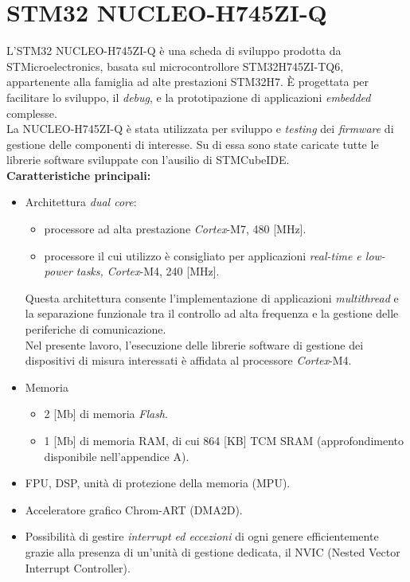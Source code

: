 \documentclass[11pt]{report}
\begin{document}
\section{STM32 NUCLEO-H745ZI-Q}
L'STM32 NUCLEO-H745ZI-Q è una scheda di sviluppo prodotta da STMicroelectronics, basata sul microcontrollore STM32H745ZI-TQ6, 
appartenente alla famiglia ad alte prestazioni STM32H7. È progettata per facilitare lo sviluppo, il \textit{debug}, e la prototipazione di applicazioni 
\textit{embedded} complesse.\\
La NUCLEO-H745ZI-Q è stata utilizzata per sviluppo e \textit{testing} dei \textit{firmware} di gestione delle componenti di interesse.
Su di essa sono state caricate tutte le librerie software sviluppate con l'ausilio di STMCubeIDE.\\
\textbf{Caratteristiche principali:}
\begin{itemize}
    \item Architettura \textit{dual core}:
    \begin{itemize}
        \item processore ad alta prestazione \textit{Cortex}-M7, 480 [MHz].
        \item processore il cui utilizzo è consigliato per applicazioni \textit{real-time e low-power tasks, Cortex}-M4, 240 [MHz].
    \end{itemize}
        Questa architettura consente l'implementazione di applicazioni \textit{multithread} e la separazione funzionale tra il controllo ad alta frequenza e la gestione delle periferiche di comunicazione.\\
        Nel presente lavoro, l'esecuzione delle librerie software di gestione dei dispositivi di misura interessati è affidata al processore \textit{Cortex}-M4.
    \item Memoria
    \begin{itemize}
        \item 2 [Mb] di memoria \textit{Flash}.
        \item 1 [Mb] di memoria RAM, di cui 864 [KB] TCM SRAM (approfondimento disponibile nell'appendice A).
    \end{itemize}
    \item FPU, DSP, unità di protezione della memoria (MPU).  
    \item Acceleratore grafico Chrom-ART (DMA2D).
    \item Possibilità di gestire \textit{interrupt ed eccezioni} di ogni genere efficientemente grazie alla presenza di un'unità di gestione dedicata, il NVIC (Nested Vector Interrupt Controller).\\
\end{itemize}
\end{document}
